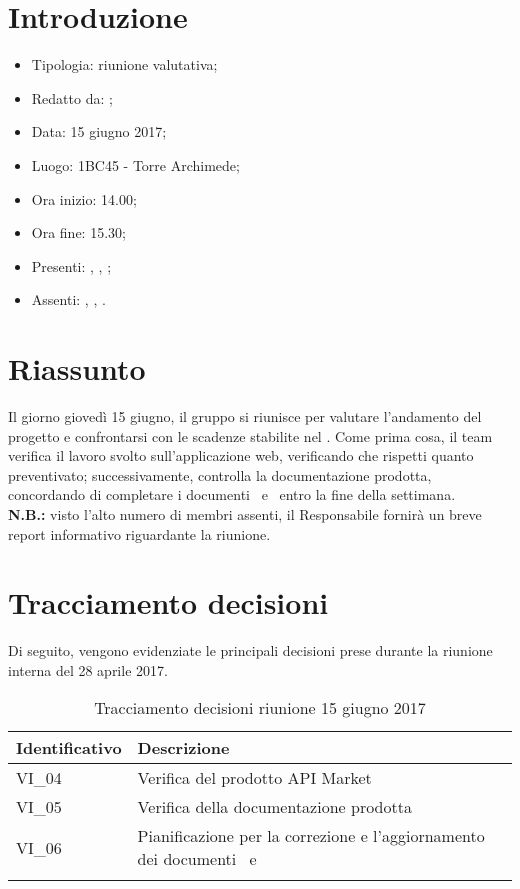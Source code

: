 \section{Introduzione}

	\begin{itemize}
		\item Tipologia: riunione valutativa;
		\item Redatto da: \NS;
		\item Data: 15 giugno 2017;
		\item Luogo: 1BC45 - Torre Archimede;
		\item Ora inizio: 14.00;
		\item Ora fine: 15.30;
		\item Presenti: \MC, \AS, \NS;	
		\item Assenti: \DS, \DAN, \AN.
	\end{itemize}

\section{Riassunto}
Il giorno giovedì 15 giugno, il gruppo si riunisce per valutare l'andamento del progetto e confrontarsi con le scadenze stabilite nel \PdP.
Come prima cosa, il team verifica il lavoro svolto sull'applicazione web, verificando che rispetti quanto preventivato; successivamente, controlla la documentazione prodotta, concordando di completare i documenti \MU\ e \MS\ entro la fine della settimana.\\
\textbf{N.B.:} visto l'alto numero di membri assenti, il Responsabile fornirà un breve report informativo riguardante la riunione.

\section{Tracciamento decisioni}
Di seguito, vengono evidenziate le principali decisioni prese durante la riunione interna del 28 aprile 2017.

\begin{longtable}{|>{\centering\arraybackslash}p{4cm}|>{\centering\arraybackslash}p{9cm}|}
	\hline \rowcolor{Gray}
	\textbf{Identificativo} & \textbf{Descrizione}\\
	\hline
	\endhead
			VI\_04	& Verifica del prodotto API Market \\
			\hline
			VI\_05 & Verifica della documentazione prodotta \\
			\hline
			VI\_06 & Pianificazione per la correzione e l'aggiornamento dei documenti \MU\ e \MS \\
			\hline
		\caption{Tracciamento decisioni riunione 15 giugno 2017}
\end{longtable}